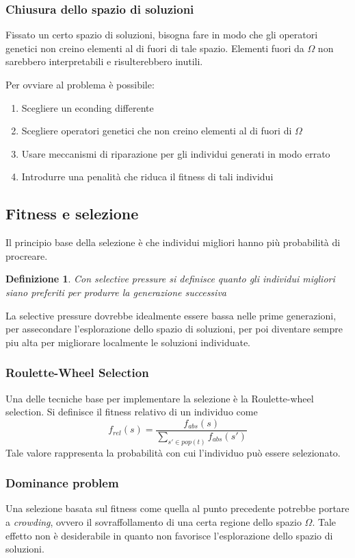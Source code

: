 \documentclass[a4paper]{article}
\newtheorem{definition}{Definizione}
\begin{document}
\subsubsection{Chiusura dello spazio di soluzioni}
Fissato un certo spazio di soluzioni, bisogna fare in modo che gli operatori 
genetici non creino elementi al di fuori di tale spazio.
Elementi fuori da $\Omega$ non sarebbero interpretabili e risulterebbero inutili.

Per ovviare al problema è possibile:
\begin{enumerate}
    \item Scegliere un econding differente
    \item Scegliere operatori genetici che non creino elementi al di fuori di $\Omega$
    \item Usare meccanismi di riparazione per gli individui generati in modo errato
    \item Introdurre una penalità che riduca il fitness di tali individui
\end{enumerate}

\subsection{Fitness e selezione}
Il principio base della selezione è che individui migliori hanno più probabilità
di procreare. 
\begin{definition}
    Con selective pressure si definisce quanto gli individui migliori 
    siano preferiti per produrre la generazione successiva
\end{definition}
La selective pressure dovrebbe idealmente essere bassa nelle prime generazioni, 
per assecondare l'esplorazione dello spazio di soluzioni, per poi diventare sempre 
piu alta per migliorare localmente le soluzioni individuate.

\subsubsection{Roulette-Wheel Selection}
Una delle tecniche base per implementare la selezione è la Roulette-wheel selection.
Si definisce il fitness relativo di un individuo come 
$$ 
f_{rel}(s) = \frac{f_{abs}(s)}{\sum_{s\prime\in pop(t)} f_{abs}(s\prime)}
$$
Tale valore rappresenta la probabilità con cui l'individuo può essere selezionato.

\subsubsection{Dominance problem}
Una selezione basata sul fitness come quella al punto precedente potrebbe portare a \emph{crowding}, ovvero
il sovraffollamento di una certa regione dello spazio $\Omega$.
Tale effetto non è desiderabile in quanto non favorisce l'esplorazione dello spazio di soluzioni.
\end{document}
